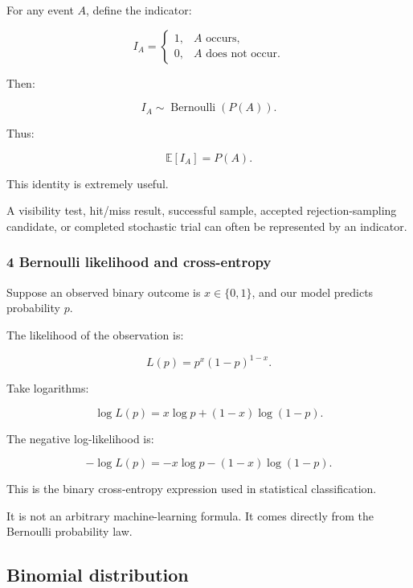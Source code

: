\hypertarget{02-foundations-ii-ch023-bernoulli-variables-as-indicators}{}

For any event \(A\), define the indicator:

\[
 I_A= \begin{cases} 1,&A\text{ occurs},\\ 0,&A\text{ does not occur}. \end{cases}
\]

Then:

\[
 I_A\sim\operatorname{Bernoulli}(P(A)).
\]

Thus:

\[
 \boxed{\mathbb E[I_A]=P(A)}.
\]

This identity is extremely useful.

A visibility test, hit/miss result, successful sample, accepted rejection-sampling candidate, or completed stochastic trial can often be represented by an indicator.

\subsubsection{4 Bernoulli likelihood and cross-entropy}\label{02-foundations-ii-ch023-bernoulli-likelihood-and-cross-entropy}

\hypertarget{02-foundations-ii-ch023-bernoulli-likelihood-and-cross-entropy}{}

Suppose an observed binary outcome is \(x\in\{0,1\}\), and our model predicts probability \(p\).

The likelihood of the observation is:

\[
 L(p)=p^x(1-p)^{1-x}.
\]

Take logarithms:

\[
 \log L(p)= x\log p+(1-x)\log(1-p).
\]

The negative log-likelihood is:

\[
 \boxed{ -\log L(p)= -x\log p-(1-x)\log(1-p) }.
\]

This is the binary cross-entropy expression used in statistical classification.

It is not an arbitrary machine-learning formula. It comes directly from the Bernoulli probability law.

\subsection{Binomial distribution}\label{02-foundations-ii-ch023-binomial-distribution}

\hypertarget{02-foundations-ii-ch023-binomial-distribution}{}

